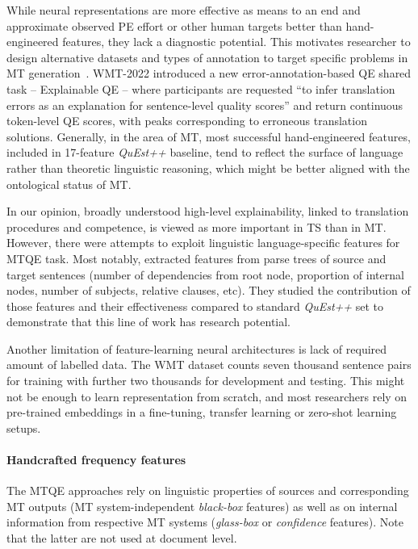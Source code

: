 While neural representations are more effective as means to an end and approximate observed PE effort or other human targets better than hand-engineered features, they lack a diagnostic potential. This motivates researcher to design alternative datasets and types of annotation to target specific problems in MT generation~\cite[see research by][mentioned above]{Scarton2016, Voita2019}. 
WMT-2022 introduced a new error-annotation-based QE shared task -- Explainable QE -- where participants are requested ``to infer translation errors as an explanation for sentence-level quality scores'' and return continuous token-level QE scores, with peaks corresponding to erroneous translation solutions.
Generally, in the area of MT, most successful hand-engineered features, included in 17-feature \textit{QuEst++} baseline, tend to reflect the surface of language rather than theoretic linguistic reasoning, which might be better aligned with the ontological status of MT.

In our opinion, broadly understood high-level explainability, linked to translation procedures and competence, is viewed as more important in TS than in MT.
However, there were attempts to exploit linguistic language-specific features for MTQE task. Most notably, \citet{Kozlova2016} extracted features from parse trees of source and target sentences (number of dependencies from root node, proportion of internal nodes, number of subjects, relative clauses, etc). They studied the contribution of those features and their effectiveness compared to standard \textit{QuEst++} set to demonstrate that this line of work has research potential. %

Another limitation of feature-learning neural architectures is lack of required amount of labelled data. The WMT dataset counts seven thousand sentence pairs for training with further two thousands for development and testing. This might not be enough to learn representation from scratch,
and most researchers rely on pre-trained embeddings in a fine-tuning, transfer learning or zero-shot learning setups.
 
\paragraph{\label{par:mt_handcrafted}Handcrafted frequency features} 
The \gls*{MTQE} approaches rely on linguistic properties of sources and corresponding MT outputs (MT system-independent \textit{black-box} features) as well as on internal information from respective MT systems (\textit{glass-box} or \textit{confidence} features). Note that the latter are not used at document level. 

